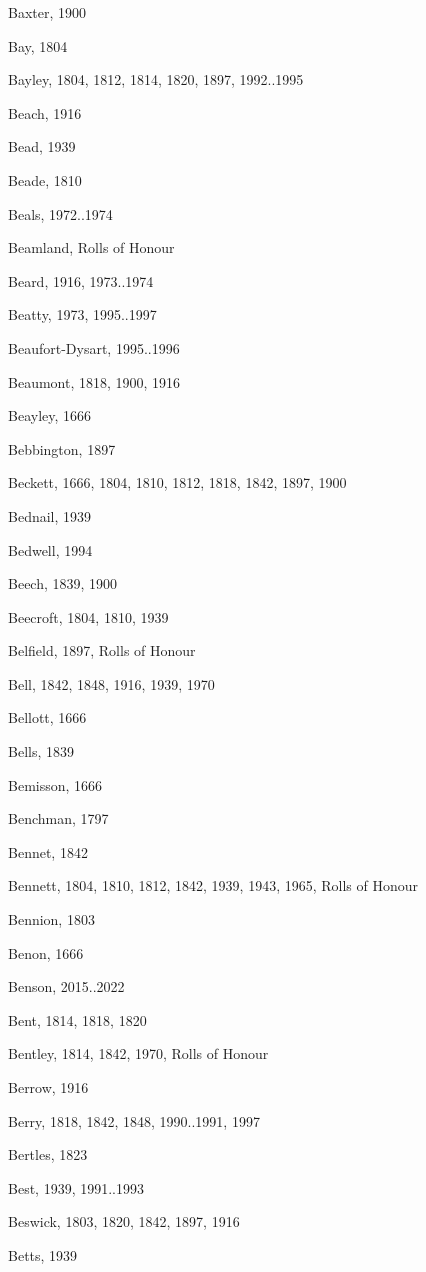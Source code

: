 \begin{theindex}
\item Baxter, 1900
\item Bay, 1804
\item Bayley, 1804, 1812, 1814, 1820, 1897, 1992..1995
\item Beach, 1916
\item Bead, 1939
\item Beade, 1810
\item Beals, 1972..1974
\item Beamland, Rolls of Honour
\item Beard, 1916, 1973..1974
\item Beatty, 1973, 1995..1997
\item Beaufort-Dysart, 1995..1996
\item Beaumont, 1818, 1900, 1916
\item Beayley, 1666
\item Bebbington, 1897
\item Beckett, 1666, 1804, 1810, 1812, 1818, 1842, 1897, 1900
\item Bednail, 1939
\item Bedwell, 1994
\item Beech, 1839, 1900
\item Beecroft, 1804, 1810, 1939
\item Belfield, 1897, Rolls of Honour
\item Bell, 1842, 1848, 1916, 1939, 1970
\item Bellott, 1666
\item Bells, 1839
\item Bemisson, 1666
\item Benchman, 1797
\item Bennet, 1842
\item Bennett, 1804, 1810, 1812, 1842, 1939, 1943, 1965, Rolls of Honour
\item Bennion, 1803
\item Benon, 1666
\item Benson, 2015..2022
\item Bent, 1814, 1818, 1820
\item Bentley, 1814, 1842, 1970, Rolls of Honour
\item Berrow, 1916
\item Berry, 1818, 1842, 1848, 1990..1991, 1997
\item Bertles, 1823
\item Best, 1939, 1991..1993
\item Beswick, 1803, 1820, 1842, 1897, 1916
\item Betts, 1939

\end{theindex}
